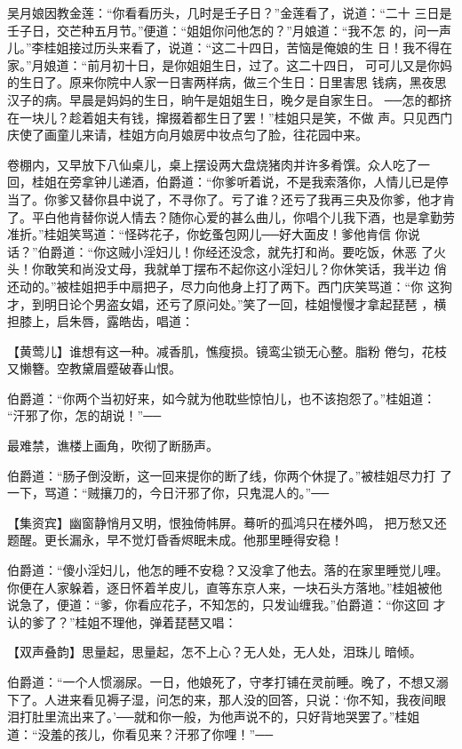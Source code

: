 吴月娘因教金莲：“你看看历头，几时是壬子日？”金莲看了，说道：“二十
三日是壬子日，交芒种五月节。”便道：“姐姐你问他怎的？”月娘道：“我不怎
的，问一声儿。”李桂姐接过历头来看了，说道：“这二十四日，苦恼是俺娘的生
日！我不得在家。”月娘道：“前月初十日，是你姐姐生日，过了。这二十四日，
可可儿又是你妈的生日了。原来你院中人家一日害两样病，做三个生日：日里害思
钱病，黑夜思汉子的病。早晨是妈妈的生日，晌午是姐姐生日，晚夕是自家生日。
──怎的都挤在一块儿？趁着姐夫有钱，撺掇着都生日了罢！”桂姐只是笑，不做
声。只见西门庆使了画童儿来请，桂姐方向月娘房中妆点匀了脸，往花园中来。

卷棚内，又早放下八仙桌儿，桌上摆设两大盘烧猪肉并许多肴馔。众人吃了一
回，桂姐在旁拿钟儿递酒，伯爵道：“你爹听着说，不是我索落你，人情儿已是停
当了。你爹又替你县中说了，不寻你了。亏了谁？还亏了我再三央及你爹，他才肯
了。平白他肯替你说人情去？随你心爱的甚么曲儿，你唱个儿我下酒，也是拿勤劳
准折。”桂姐笑骂道：“怪硶花子，你虼蚤包网儿──好大面皮！爹他肯信
你说话？”伯爵道：“你这贼小淫妇儿！你经还没念，就先打和尚。要吃饭，休恶
了火头！你敢笑和尚没丈母，我就单丁摆布不起你这小淫妇儿？你休笑话，我半边
俏还动的。”被桂姐把手中扇把子，尽力向他身上打了两下。西门庆笑骂道：“你
这狗才，到明日论个男盗女娼，还亏了原问处。”笑了一回，桂姐慢慢才拿起琵琶
，横担膝上，启朱唇，露皓齿，唱道：

【黄莺儿】谁想有这一种。减香肌，憔瘦损。镜鸾尘锁无心整。脂粉
倦匀，花枝又懒簪。空教黛眉蹙破春山恨。

伯爵道：“你两个当初好来，如今就为他耽些惊怕儿，也不该抱怨了。”桂姐道：
“汗邪了你，怎的胡说！”──

最难禁，谯楼上画角，吹彻了断肠声。

伯爵道：“肠子倒没断，这一回来提你的断了线，你两个休提了。”被桂姐尽力打
了一下，骂道：“贼攘刀的，今日汗邪了你，只鬼混人的。”──

【集资宾】幽窗静悄月又明，恨独倚帏屏。蓦听的孤鸿只在楼外鸣，
把万愁又还题醒。更长漏永，早不觉灯昏香烬眠未成。他那里睡得安稳！

伯爵道：“傻小淫妇儿，他怎的睡不安稳？又没拿了他去。落的在家里睡觉儿哩。
你便在人家躲着，逐日怀着羊皮儿，直等东京人来，一块石头方落地。”桂姐被他
说急了，便道：“爹，你看应花子，不知怎的，只发讪缠我。”伯爵道：“你这回
才认的爹了？”桂姐不理他，弹着琵琶又唱：

【双声叠韵】思量起，思量起，怎不上心？无人处，无人处，泪珠儿
暗倾。

伯爵道：“一个人惯溺尿。一日，他娘死了，守孝打铺在灵前睡。晚了，不想又溺
下了。人进来看见褥子湿，问怎的来，那人没的回答，只说：‘你不知，我夜间眼
泪打肚里流出来了。’──就和你一般，为他声说不的，只好背地哭罢了。”桂姐
道：“没羞的孩儿，你看见来？汗邪了你哩！”──

